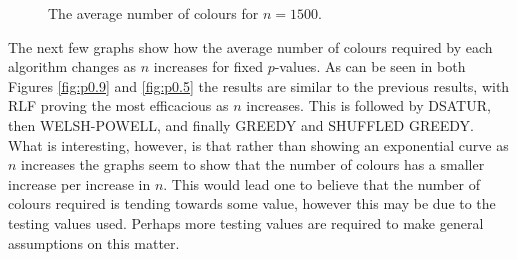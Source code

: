 \begin{figure}[H]
    \centering

  \caption{The average number of colours for $n = 1500$.}
    \label{fig:V1500p}
\end{figure}   

The next few graphs show how the average number of colours required by each algorithm changes as $n$ increases for fixed $p$-values. As can be seen in both Figures \ref{fig:p0.9} and \ref{fig:p0.5} the results are similar to the previous results, with RLF proving the most efficacious as $n$ increases. This is followed by DSATUR, then WELSH-POWELL, and finally GREEDY and SHUFFLED GREEDY. What is interesting, however, is that rather than showing an exponential curve as $n$ increases the graphs seem to show that the number of colours has a smaller increase per increase in $n$. This would lead one to believe that the number of colours required is tending towards some value, however this may be due to the testing values used. Perhaps more testing values are required to make general assumptions on this matter. 

